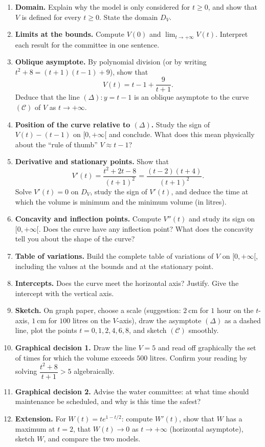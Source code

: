 \documentclass[11pt]{article}
\begin{document}
\begin{enumerate}
\item \textbf{Domain.} Explain why the model is only considered for $t \geq 0$, and show that $V$ is defined for every $t \geq 0$. State the domain $D_V$.
\item \textbf{Limits at the bounds.} Compute $V(0)$ and $\displaystyle\lim_{t \to +\infty} V(t)$. Interpret each result for the committee in one sentence.
\item \textbf{Oblique asymptote.} By polynomial division (or by writing $t^2 + 8 = (t+1)(t-1) + 9$), show that
\[ V(t) = t - 1 + \frac{9}{t+1}. \]
Deduce that the line $(\Delta): y = t - 1$ is an oblique asymptote to the curve $(\mathcal{C})$ of $V$ as $t \to +\infty$.
\item \textbf{Position of the curve relative to $(\Delta)$.} Study the sign of $V(t) - (t-1)$ on $[0, +\infty[$ and conclude. What does this mean physically about the ``rule of thumb'' $V \approx t - 1$?
\item \textbf{Derivative and stationary points.} Show that
\[ V'(t) = \frac{t^{2} + 2t - 8}{(t+1)^{2}} = \frac{(t-2)(t+4)}{(t+1)^{2}}. \]
Solve $V'(t) = 0$ on $D_V$, study the sign of $V'(t)$, and deduce the time at which the volume is minimum and the minimum volume (in litres).
\item \textbf{Concavity and inflection points.} Compute $V''(t)$ and study its sign on $[0, +\infty[$. Does the curve have any inflection point? What does the concavity tell you about the shape of the curve?
\item \textbf{Table of variations.} Build the complete table of variations of $V$ on $[0, +\infty[$, including the values at the bounds and at the stationary point.
\item \textbf{Intercepts.} Does the curve meet the horizontal axis? Justify. Give the intercept with the vertical axis.
\item \textbf{Sketch.} On graph paper, choose a scale (suggestion: $2\ \mathrm{cm}$ for $1$ hour on the $t$-axis, $1\ \mathrm{cm}$ for $100$ litres on the $V$-axis), draw the asymptote $(\Delta)$ as a dashed line, plot the points $t = 0, 1, 2, 4, 6, 8$, and sketch $(\mathcal{C})$ smoothly.
\item \textbf{Graphical decision 1.} Draw the line $V = 5$ and read off graphically the set of times for which the volume exceeds $500$ litres. Confirm your reading by solving $\dfrac{t^{2}+8}{t+1} > 5$ algebraically.
\item \textbf{Graphical decision 2.} Advise the water committee: at what time should maintenance be scheduled, and why is this time the safest?
\item \textbf{Extension.} For $W(t) = t e^{1 - t/2}$: compute $W'(t)$, show that $W$ has a maximum at $t = 2$, that $W(t) \to 0$ as $t \to +\infty$ (horizontal asymptote), sketch $W$, and compare the two models.
\end{enumerate}
\end{document}
